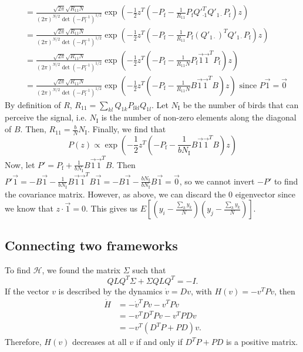 \documentclass{article}
\begin{document}
\begin{align*}
\\&=\frac{\sqrt{2\pi}\sqrt{R_{11}N}}{(2\pi)^{N/2}\det(-P_\text{f}^{-1})^{1/2}}\exp\left(-\frac{1}{2}z^T(-P_\text{f}-\frac{1}{R_{11}}P_\text{f}Q'^T_{\cdot 1}Q'_{1\cdot}P_\text{f})z\right)
\\&=\frac{\sqrt{2\pi}\sqrt{R_{11}N}}{(2\pi)^{N/2}\det(-P_\text{f}^{-1})^{1/2}}\exp\left(-\frac{1}{2}z^T(-P_\text{f}-\frac{1}{R_{11}}P_\text{f}(Q'_{1\cdot})^TQ'_{1\cdot}P_\text{f})z\right)
\\&=\frac{\sqrt{2\pi}\sqrt{R_{11}N}}{(2\pi)^{N/2}\det(-P_\text{f}^{-1})^{1/2}}\exp\left(-\frac{1}{2}z^T(-P_\text{f}-\frac{1}{R_{11}N}P_\text{f}\vec{1}\vec{1}^T P_\text{f})z\right) 
\\&=\frac{\sqrt{2\pi}\sqrt{R_{11}N}}{(2\pi)^{N/2}\det(-P_\text{f}^{-1})^{1/2}}\exp\left(-\frac{1}{2}z^T(-P_\text{f}-\frac{1}{R_{11}N}B\vec{1}\vec{1}^T B)z\right)  \text{ since $P\vec{1}=\vec{0}$}
\end{align*}
By definition of $R$, $R_{11}=\sum_{kl}Q_{1k}P_{\text{f}kl}Q_{1l}$. Let $N_\text{I}$ be the number of birds that can perceive the signal, i.e. $N_\text{I}$ is the number of non-zero elements along the diagonal of $B$. Then, $R_{11}=\frac{b}{N}N_\text{I}$. 
Finally, we find that 
\begin{equation}
P(z)\propto \exp\left(-\frac{1}{2}z^T(-P_\text{f}-\frac{1}{bN_\text{I}}B\vec{1}\vec{1}^TB)z\right)
\end{equation}
Now, let $P'=P_\text{f}+\frac{1}{bN_\text{I}}B\vec{1}\vec{1}^TB$. Then $P'\vec{1}=-B\vec{1}-\frac{1}{bN_\text{I}}B\vec{1}\vec{1}^TB\vec{1}=-B\vec{1}-\frac{bN_\text{I}}{bN_\text{I}}B\vec{1}=\vec{0}$, so we cannot invert $-P'$ to find the covariance matrix. However, as above, we can discard the $0$ eigenvector since we know that $z\cdot \vec{1}=0$. This gives us $E[(y_i-\frac{\sum_ky_k}{N})(y_j-\frac{\sum_ky_k}{N})]$.

\subsection{Connecting two frameworks }
To find $\mathscr{H}$, we found the matrix $\Sigma$ such that 
\begin{equation}
QLQ^T\Sigma+\Sigma QLQ^T=-I.
\end{equation}
If the vector $v$ is described by the dynamics $\dot{v}=Dv$, with $H(v)=-v^TPv$, then
\begin{align*}
\dot{H}&=-\dot{v}^TPv-v^TP\dot{v}
\\&=-v^TD^TPv-v^TPDv
\\&=-v^T(D^TP+PD)v.
\end{align*}
Therefore, $H(v)$ decreases at all $v$ if and only if $D^TP+PD$ is a positive matrix.
\end{document}
